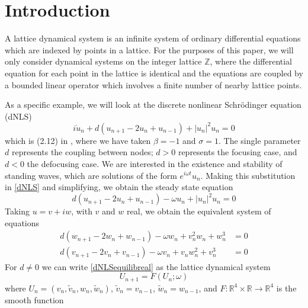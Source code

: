 \documentclass[12pt]{article}
\def\R{{\mathbb R}}
\def\Z{{\mathbb Z}}
\begin{document}
\section{Introduction}

A lattice dynamical system is an infinite system of ordinary differential equations which are indexed by points in a lattice. For the purposes of this paper, we will only consider dynamical systems on the integer lattice $\Z$, where the differential equation for each point in the lattice is identical and the equations are coupled by a bounded linear operator which involves a finite number of nearby lattice points.

As a specific example, we will look at the discrete nonlinear Schr{\"o}dinger equation (dNLS)
\begin{equation}\label{dNLS}
i\dot{u}_n + d(u_{n+1} - 2 u_n + u_{n-1}) + |u_n|^2 u_n = 0
\end{equation}
which is (2.12) in \cite{Kevrekidis2009}, where we have taken $\beta = -1$ and $\sigma = 1$. The single parameter $d$ represents the coupling between nodes; $d > 0$ represents the focusing case, and $d < 0$ the defocusing case. We are interested in the existence and stability of standing waves, which are solutions of the form $e^{i \omega t}u_n$. Making this substitution in \eqref{dNLS} and simplifying, we obtain the steady state equation
\begin{equation}\label{dNLSequilib}
d(u_{n+1} - 2 u_n + u_{n-1}) - \omega u_n + |u_n|^2 u_n = 0
\end{equation}
Taking $u = v + i w$, with $v$ and $w$ real, we obtain the equivalent system of equations
\begin{equation}\label{dNLSequilibreal}
\begin{aligned}
d (w_{n+1} - 2 w_n + w_{n-1}) - \omega w_n + v_n^2 w_n + w_n^3 &= 0 \\
d (v_{n+1} - 2 v_n + v_{n-1}) - \omega v_n + v_n w_n^2 + v_n^3 &= 0
\end{aligned}
\end{equation}
For $d \neq 0$ we can write \eqref{dNLSequilibreal} as the lattice dynamical system
\begin{equation}\label{DNLSlattice1}
U_{n+1} = F(U_n; \omega)
\end{equation}
where $U_n = (v_n, \tilde{v}_n, w_n, \tilde{w}_n)$, $\tilde{v}_n = v_{n-1}$, $\tilde{w}_n = w_{n-1}$, and $F:\R^4 \times \R \rightarrow \R^4$ is the smooth function
\end{document}
